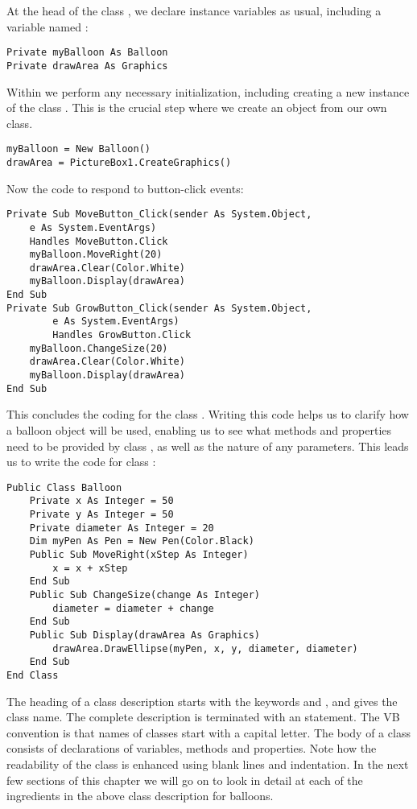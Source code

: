 		At the head of the class , we declare instance variables as usual, including a variable named :
		\begin{lstlisting}
Private myBalloon As Balloon
Private drawArea As Graphics
		\end{lstlisting}
		Within  we perform any necessary initialization, including creating a new instance of the class . This is the crucial step where we create an object from our own class.
		\begin{lstlisting}
myBalloon = New Balloon()
drawArea = PictureBox1.CreateGraphics()
		\end{lstlisting}
		Now the code to respond to button-click events:
		\begin{lstlisting}
Private Sub MoveButton_Click(sender As System.Object,
	e As System.EventArgs)
	Handles MoveButton.Click
	myBalloon.MoveRight(20)
	drawArea.Clear(Color.White)
	myBalloon.Display(drawArea)
End Sub
Private Sub GrowButton_Click(sender As System.Object,
		e As System.EventArgs)
		Handles GrowButton.Click
	myBalloon.ChangeSize(20)
	drawArea.Clear(Color.White)
	myBalloon.Display(drawArea)
End Sub
		\end{lstlisting}
		This concludes the coding for the class . Writing this code helps us to clarify how a balloon object will be used, enabling us to see what methods and properties need to be provided by class , as well as the nature of any parameters. This leads us to write the code for class :
		\begin{lstlisting}
Public Class Balloon
	Private x As Integer = 50
	Private y As Integer = 50
	Private diameter As Integer = 20
	Dim myPen As Pen = New Pen(Color.Black)
	Public Sub MoveRight(xStep As Integer)
		x = x + xStep
	End Sub
	Public Sub ChangeSize(change As Integer)
		diameter = diameter + change
	End Sub
	Public Sub Display(drawArea As Graphics)
		drawArea.DrawEllipse(myPen, x, y, diameter, diameter)
	End Sub
End Class
		\end{lstlisting}
		The heading of a class description starts with the keywords  and , and gives the class name. The complete description is terminated with an  statement. The VB convention is that names of classes start with a capital letter. The body of a class consists of declarations of variables, methods and properties. Note how the readability of the class is enhanced using blank lines and indentation. In the next few sections of this chapter we will go on to look in detail at each of the ingredients in the above class description for balloons.
		
